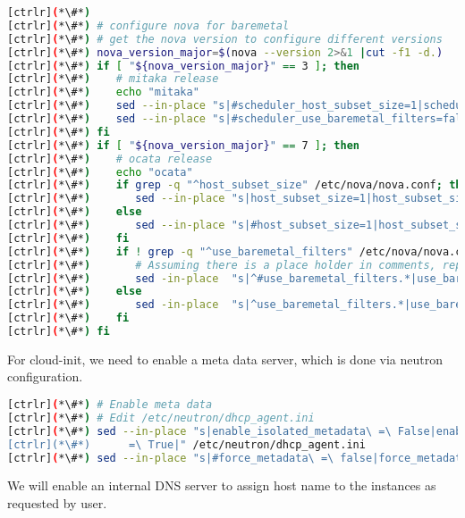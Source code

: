 \begin{lstlisting}[language=bash,keywords={}]
[ctrlr](*\#*) 
[ctrlr](*\#*) # configure nova for baremetal
[ctrlr](*\#*) # get the nova version to configure different versions 
[ctrlr](*\#*) nova_version_major=$(nova --version 2>&1 |cut -f1 -d.)
[ctrlr](*\#*) if [ "${nova_version_major}" == 3 ]; then
[ctrlr](*\#*)    # mitaka release
[ctrlr](*\#*)    echo "mitaka"
[ctrlr](*\#*)    sed --in-place "s|#scheduler_host_subset_size=1|scheduler_host_subset_size=9999999|" /etc/nova/nova.conf
[ctrlr](*\#*)    sed --in-place "s|#scheduler_use_baremetal_filters=false|scheduler_use_baremetal_filters=true|" /etc/nova/nova.conf
[ctrlr](*\#*) fi
[ctrlr](*\#*) if [ "${nova_version_major}" == 7 ]; then
[ctrlr](*\#*)    # ocata release
[ctrlr](*\#*)    echo "ocata"
[ctrlr](*\#*)    if grep -q "^host_subset_size" /etc/nova/nova.conf; then
[ctrlr](*\#*)       sed --in-place "s|host_subset_size=1|host_subset_size=9999999|" /etc/nova/nova.conf
[ctrlr](*\#*)    else
[ctrlr](*\#*)       sed --in-place "s|#host_subset_size=1|host_subset_size=9999999|" /etc/nova/nova.conf
[ctrlr](*\#*)    fi
[ctrlr](*\#*)    if ! grep -q "^use_baremetal_filters" /etc/nova/nova.conf; then
[ctrlr](*\#*)       # Assuming there is a place holder in comments, replace that string
[ctrlr](*\#*)       sed -in-place  "s|^#use_baremetal_filters.*|use_baremetal_filters=true|" /etc/nova/nova.conf
[ctrlr](*\#*)    else 
[ctrlr](*\#*)       sed -in-place  "s|^use_baremetal_filters.*|use_baremetal_filters=true|" /etc/nova/nova.conf
[ctrlr](*\#*)    fi
[ctrlr](*\#*) fi
\end{lstlisting} 

	For cloud-init, we need to enable a meta data server, which is done via neutron configuration.


\begin{lstlisting}[language=bash,keywords={}]
[ctrlr](*\#*) # Enable meta data
[ctrlr](*\#*) # Edit /etc/neutron/dhcp_agent.ini
[ctrlr](*\#*) sed --in-place "s|enable_isolated_metadata\ =\ False|enable_isolated_metadata\ \
[ctrlr](*\#*)      =\ True|" /etc/neutron/dhcp_agent.ini
[ctrlr](*\#*) sed --in-place "s|#force_metadata\ =\ false|force_metadata\ =\ \True|" /etc/neutron/dhcp_agent.ini
\end{lstlisting} 

	We will enable an internal DNS server to assign host name to the instances as requested by user. 

